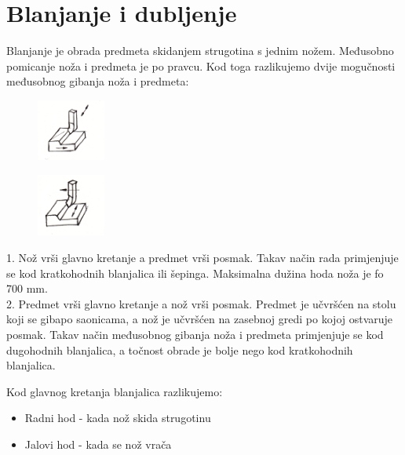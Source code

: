 \documentclass[a4paper,12pt]{article}
\numberwithin{figure}{section}
\begin{document}
\section{Blanjanje i dubljenje}
Blanjanje je obrada predmeta skidanjem strugotina s jednim nožem. Međusobno pomicanje noža i predmeta je po pravcu. Kod toga razlikujemo dvije mogučnosti međusobnog gibanja noža i predmeta:\\
\begin{figure}
  \begin{center}
  \vspace{-1cm}
    \includegraphics[width=0.2\textwidth]{image_14-1.png}
  \end{center}
\end{figure}
\begin{figure}
\vspace{-3cm}
  \begin{center}
    \includegraphics[width=0.2\textwidth]{image_14-2.png}
  \end{center}
\end{figure}
1. Nož vrši glavno kretanje a predmet vrši posmak. Takav način rada primjenjuje se kod kratkohodnih blanjalica ili šepinga. Maksimalna dužina hoda noža je fo 700 mm.\\
2. Predmet vrši glavno kretanje a nož vrši posmak. Predmet je učvršćen na stolu koji se gibapo saonicama, a nož je učvršćen na zasebnoj gredi po kojoj ostvaruje posmak. Takav način međusobnog gibanja noža i predmeta primjenjuje se kod dugohodnih blanjalica, a točnost obrade je bolje nego kod kratkohodnih blanjalica.\par
\vspace{2cm}
\noindent Kod glavnog kretanja blanjalica razlikujemo:
\begin{itemize}
\item Radni hod - kada nož skida strugotinu
\item Jalovi hod - kada se nož vrača
\end{itemize}
\end{document}
